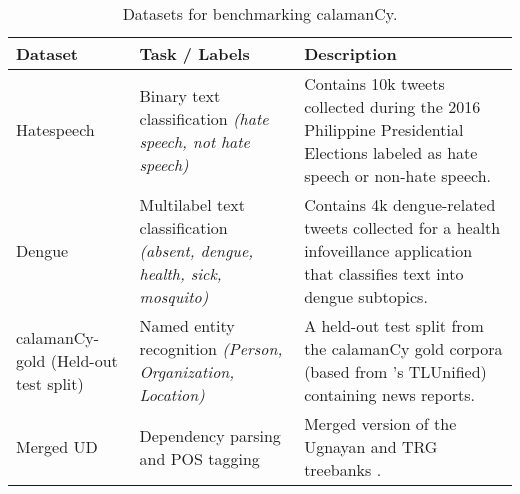 \documentclass[../emnlp2023.tex]{subfiles}
\begin{document}
\begin{table*}[t]
\begin{tabular}{@{}p{4cm}p{4cm}p{7.25cm}@{}}
\toprule
Dataset &  Task / Labels & Description  \\ \midrule
Hatespeech \citep{Cabasag2016HatespeechIP} & Binary text classification \textit{(hate speech, not hate speech)} & Contains 10k tweets collected during the 2016 Philippine Presidential Elections labeled as hate speech or non-hate speech. \\
Dengue \citep{Livelo2018IntelligentDI}  & Multilabel text classification \textit{(absent, dengue, health, sick, mosquito)}   & Contains 4k dengue-related tweets collected for a health infoveillance application that classifies text into dengue subtopics.\\
calamanCy-gold (Held-out test split) & Named entity recognition \textit{(Person, Organization, Location)} & A held-out test split from the calamanCy gold corpora (based from \citealp{Cruz2021ImprovingLL}'s TLUnified) containing news reports. \\ 
Merged UD & Dependency parsing and POS tagging & Merged version of the Ugnayan and TRG treebanks \citep{Aquino2020ParsingIT,Samson2018TRG}. \\ \bottomrule
\end{tabular}
\caption{
    Datasets for benchmarking calamanCy. 
}
\label{table:benchmark_datasets}
\end{table*}
\end{document}
